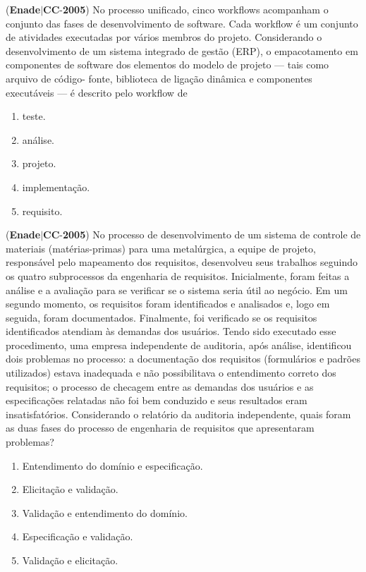 \documentclass{exam}
\begin{document}
\begin{questions}
\begin{enumerate}[label=\alph*)]
	\end{enumerate}

\question (\textbf{Enade}$|$\textbf{CC}-\textbf{2005}) No processo unificado, cinco workflows acompanham o conjunto
das fases de desenvolvimento de software. Cada workflow é um
conjunto de atividades executadas por vários membros do projeto.
Considerando o desenvolvimento de um sistema integrado de
gestão (ERP), o empacotamento em componentes de software dos
elementos do modelo de projeto — tais como arquivo de código-
fonte, biblioteca de ligação dinâmica e componentes executáveis
— é descrito pelo workflow de
	\begin{enumerate}[label=\alph*)]
		\item  teste.
		\item  análise.
		\item  projeto.
		\item  implementação.
		\item  requisito.

	\end{enumerate}

\question (\textbf{Enade}$|$\textbf{CC}-\textbf{2005}) No processo de desenvolvimento de um sistema de
controle de materiais (matérias-primas) para uma
metalúrgica, a equipe de projeto, responsável pelo
mapeamento dos requisitos, desenvolveu seus trabalhos
seguindo os quatro subprocessos da engenharia de
requisitos. Inicialmente, foram feitas a análise e a avaliação
para se verificar se o sistema seria útil ao negócio. Em um
segundo momento, os requisitos foram identificados e
analisados e, logo em seguida, foram documentados.
Finalmente, foi verificado se os requisitos identificados
atendiam às demandas dos usuários. Tendo sido executado
esse procedimento, uma empresa independente de
auditoria, após análise, identificou dois problemas no
processo: a documentação dos requisitos (formulários e
padrões utilizados) estava inadequada e não possibilitava
o entendimento correto dos requisitos; o processo de
checagem entre as demandas dos usuários e as
especificações relatadas não foi bem conduzido e seus
resultados eram insatisfatórios.
Considerando o relatório da auditoria independente, quais foram
as duas fases do processo de engenharia de requisitos que
apresentaram problemas?
	\begin{enumerate}[label=\alph*)]
		\item  Entendimento do domínio e especificação.
		\item  Elicitação e validação.
		\item  Validação e entendimento do domínio.
		\item  Especificação e validação.
		\item  Validação e elicitação.


\end{enumerate}
\end{questions}
\end{document}
